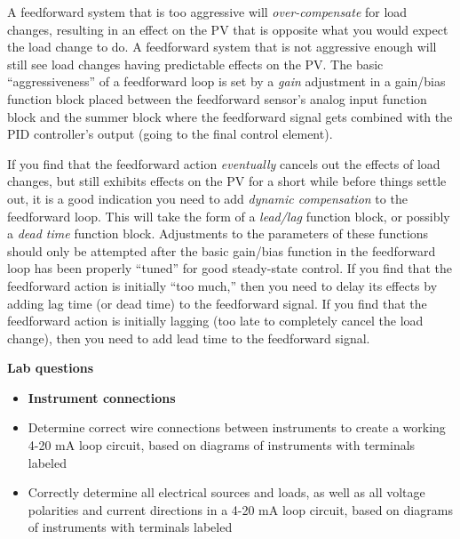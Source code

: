 A feedforward system that is too aggressive will {\it over-compensate} for load changes, resulting in an effect on the PV that is opposite what you would expect the load change to do.  A feedforward system that is not aggressive enough will still see load changes having predictable effects on the PV.  The basic ``aggressiveness'' of a feedforward loop is set by a {\it gain} adjustment in a gain/bias function block placed between the feedforward sensor's analog input function block and the summer block where the feedforward signal gets combined with the PID controller's output (going to the final control element).

If you find that the feedforward action {\it eventually} cancels out the effects of load changes, but still exhibits effects on the PV for a short while before things settle out, it is a good indication you need to add {\it dynamic compensation} to the feedforward loop.  This will take the form of a {\it lead/lag} function block, or possibly a {\it dead time} function block.  Adjustments to the parameters of these functions should only be attempted after the basic gain/bias function in the feedforward loop has been properly ``tuned'' for good steady-state control.  If you find that the feedforward action is initially ``too much,'' then you need to delay its effects by adding lag time (or dead time) to the feedforward signal.  If you find that the feedforward action is initially lagging (too late to completely cancel the load change), then you need to add lead time to the feedforward signal.






\vfil \eject

\noindent
{\bf Lab questions}

\vskip 5pt

\begin{itemize}
\item{} {\bf Instrument connections}
\item{} Determine correct wire connections between instruments to create a working 4-20 mA loop circuit, based on diagrams of instruments with terminals labeled
\item{} Correctly determine all electrical sources and loads, as well as all voltage polarities and current directions in a 4-20 mA loop circuit, based on diagrams of instruments with terminals labeled
\end{itemize}

\filbreak

